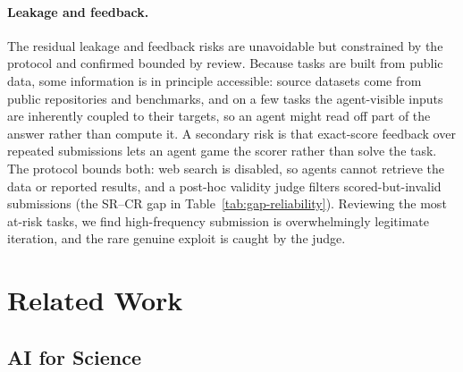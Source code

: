 \documentclass{llmxive}
\begin{document}
\paragraph{Leakage and feedback.}
The residual leakage and feedback risks are unavoidable but constrained by the protocol and confirmed bounded by review. Because tasks are built from public data, some information is in principle accessible: source datasets come from public repositories and benchmarks, and on a few tasks the agent-visible inputs are inherently coupled to their targets, so an agent might read off part of the answer rather than compute it. A secondary risk is that exact-score feedback over repeated submissions lets an agent game the scorer rather than solve the task. The protocol bounds both: web search is disabled, so agents cannot retrieve the data or reported results, and a post-hoc validity judge filters scored-but-invalid submissions (the SR--CR gap in Table~\ref{tab:gap-reliability}). Reviewing the most at-risk tasks, we find high-frequency submission is overwhelmingly legitimate iteration, and the rare genuine exploit is caught by the judge.










\section{Related Work}
\label{sec:related}


\subsection{AI for Science}
\label{sec:rel:ai4sci}
\end{document}
